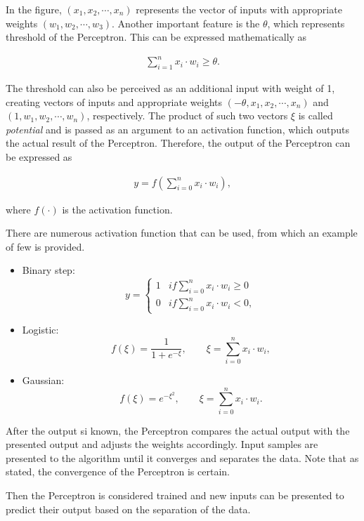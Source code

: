 In the figure, $(x_1, x_2, \cdots, x_n)$ represents the vector of inputs with appropriate weights $(w_1, w_2, \cdots, w_3)$. Another important feature is the $\theta$, which represents threshold of the Perceptron. This can be expressed mathematically as

\begin{align*}
\sum_{i=1}^{n}{x_i\cdot w_i} \geq \theta.
\end{align*}

The threshold can also be perceived as an additional input with weight of 1, creating vectors of inputs and appropriate weights $(-\theta, x_1, x_2, \cdots, x_n)$ and $(1, w_1, w_2, \cdots, w_n)$, respectively. The product of such two vectors $\xi$ is called \textit{potential} and is passed as an argument to an activation function, which outputs the actual result of the Perceptron. Therefore, the output of the Perceptron can be expressed as

\begin{align*}
y = f\left(\sum_{i=0}^{n}{x_i\cdot w_i}\right),
\end{align*}

\noindent where $f(\cdot)$ is the activation function.

There are numerous activation function that can be used, from which an example of few is provided.
\begin{itemize}
\item Binary step: $$y = \begin{cases}1 & if \sum\limits_{i=0}^{n}{x_i\cdot w_i} \geq 0 \\ 0 & if \sum\limits_{i=0}^{n}{x_i\cdot w_i} < 0,\end{cases}$$
\item Logistic: $$f(\xi) = \frac{1}{1+e^{-\xi}}, \qquad \xi = \sum_{i=0}^{n}{x_i\cdot w_i},$$
\item Gaussian: $$f(\xi) = e^{-\xi^2}, \qquad \xi = \sum_{i=0}^{n}{x_i\cdot w_i}.$$
\end{itemize}

After the output si known, the Perceptron compares the actual output with the presented output and adjusts the weights accordingly. Input samples are presented to the algorithm until it converges and separates the data. Note that as \citet{NovikoffConvergenceProofsPerceptrons1962} stated, the convergence of the Perceptron is certain.

Then the Perceptron is considered trained and new inputs can be presented to predict their output based on the separation of the data.

